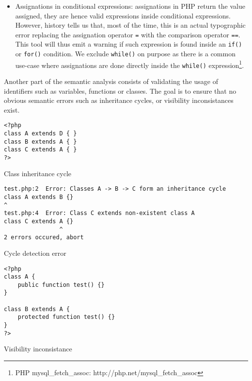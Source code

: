 \documentclass[a4paper]{article}
\begin{document}
\begin{itemize}
    variable, or an expression\footnote{PHP Variable variables:
    http://php.net/variables.variable}: (\verb=$$var= or
    \verb=${'prefix'.$name.foo()}=).
  \item Assignations in conditional expressions: assignations in PHP return the
    value assigned, they are hence valid expressions inside conditional
    expressions. However, history tells us that, most of the time, this is an
    actual typographic error replacing the assignation operator \verb&=& with
    the comparison operator \verb&==&. This tool will thus emit a warning if
    such expression is found inside an \verb&if()& or \verb&for()& condition.
    We exclude \verb&while()& on purpose as there is a common use-case where
    assignations are done directly inside the \verb&while()&
    expression\footnote{PHP mysql\_fetch\_assoc:
    http://php.net/mysql\_fetch\_assoc}.
\end{itemize}

Another part of the semantic analysis consists of validating the usage of
identifiers such as variables, functions or classes. The goal is to ensure that
no obvious semantic errors such as inheritance cycles, or visibility
inconsistances exist.

\begin{listing}
  \begin{verbatim}
<?php
class A extends D { } 
class B extends A { }
class C extends A { }
?>
  \end{verbatim}
  \caption{Class inheritance cycle}
\end{listing}

\begin{listing}
  \begin{verbatim}
test.php:2  Error: Classes A -> B -> C form an inheritance cycle
class A extends B {}
^
test.php:4  Error: Class C extends non-existent class A
class C extends A {}
                ^
2 errors occured, abort
  \end{verbatim}
  \caption{Cycle detection error}
\end{listing}

\begin{listing}
  \begin{verbatim}
<?php
class A {
    public function test() {}
}

class B extends A {
    protected function test() {}
}
?>
  \end{verbatim}
  \caption{Visibility inconsistance}
\end{listing}
\end{document}
